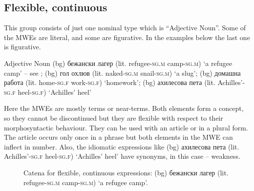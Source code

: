 \documentclass[output=paper,colorlinks,citecolor=brown]{langscibook}
\begin{document}
\subsection{Flexible, continuous}

This group consists of just one nominal type which is “Adjective Noun”. Some of the MWEs are literal, and some are figurative. In the examples below the last one is figurative.

\ea Adjective Noun
    \ea (bg) {бежански лагер } (lit.  refugee-\textsc{sg.m} camp-\textsc{sg.m}) {`a refugee camp'} -- see ;
    \ex (bg) {гол охлюв } (lit. naked-\textsc{sg.m} snail-\textsc{sg.m}) {`a slug'};
    \ex (bg) {домашна работа } (lit. home-\textsc{sg.f} work-\textsc{sg.f}) {`homework'};
    \ex (bg) {ахилесова пета } (lit. Achil\-les'-\textsc{sg.f} heel-\textsc{sg.f}) {`Achilles' heel'}
   \z
\z


Here the MWEs are mostly terms or near-terms. Both elements form a concept, so they cannot be discontinued but they are flexible with respect to their morphosyntactic behaviour. They can be used with an article or in a plural form. The article occurs only once in a phrase but both elements in the MWE can inflect in number. Also, the idiomatic expressions like (bg) {ахилесова пета } (lit. Achil\-les'-\textsc{sg.f} heel-\textsc{sg.f}) {`Achilles' heel'} have synonyms, in this case -- weakness. 

\begin{figure}
  \begin{center}  
  
  \caption{Catena for flexible, continuous expressions: (bg) {бежански лагер } (lit. refugee-\textsc{sg.m} camp-\textsc{sg.m}) {`a refugee camp'}.}
  \label{fig:FlexibleCont01}
  \end{center}  

\end{figure}
\end{document}
